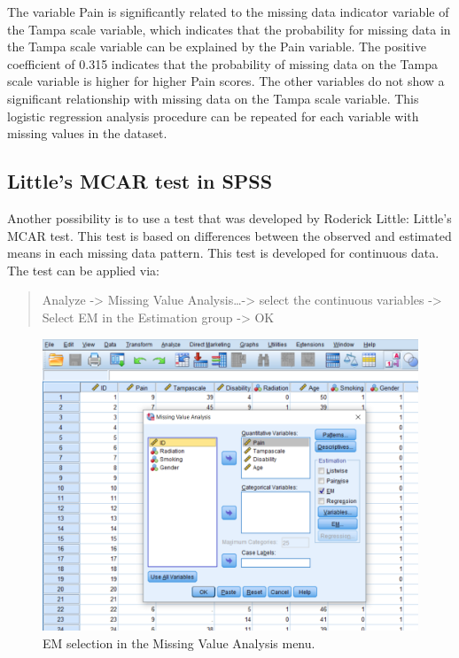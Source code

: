 \documentclass[
]{book}
\begin{document}
The variable Pain is significantly related to the missing data indicator
variable of the Tampa scale variable, which indicates that the
probability for missing data in the Tampa scale variable can be
explained by the Pain variable. The positive coefficient of 0.315
indicates that the probability of missing data on the Tampa scale
variable is higher for higher Pain scores. The other variables do not
show a significant relationship with missing data on the Tampa scale
variable. This logistic regression analysis procedure can be repeated
for each variable with missing values in the dataset.

\hypertarget{littles-mcar-test-in-spss}{%
\subsection{Little's MCAR test in
SPSS}\label{littles-mcar-test-in-spss}}

Another possibility is to use a test that was developed by Roderick
Little: Little's MCAR test. This test is based on differences between
the observed and estimated means in each missing data pattern. This test
is developed for continuous data. The test can be applied via:

\begin{quote}
Analyze -\textgreater{} Missing Value Analysis\ldots-\textgreater{}
select the continuous variables -\textgreater{} Select EM in the
Estimation group -\textgreater{} OK
\end{quote}

\begin{figure}

{\centering \includegraphics[width=0.9\linewidth]{images/fig2.13} 

}

\caption{EM selection in the Missing Value Analysis menu.}\label{fig:fig2-12}
\end{figure}
\end{document}

